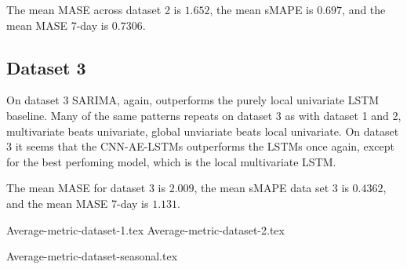 The mean MASE across dataset 2 is $1.652$,
the mean sMAPE is $0.697$,
and the mean MASE 7-day is  $0.7306$.

\subsection{Dataset 3}
On dataset 3 SARIMA, again, outperforms the purely local univariate LSTM baseline.
Many of the same patterns repeats on dataset 3 as with dataset 1 and 2, multivariate beats univariate,
global unviariate beats local univariate.
On dataset 3 it seems that the CNN-AE-LSTMs outperforms the LSTMs once again, except for the
best perfoming model, which is the local multivariate LSTM.

The mean MASE for dataset 3 is $2.009$,
the mean sMAPE data set 3 is $0.4362$,
and the mean MASE 7-day is $1.131$.



{Average-metric-dataset-1.tex}
{Average-metric-dataset-2.tex}

{Average-metric-dataset-seasonal.tex}


